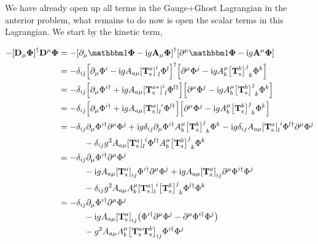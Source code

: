 We have already open up all terms in the Gauge+Ghost Lagrangian in the anterior problem,
what remains to do now is open the scalar terms in this Lagrangian. We start by the kinetic 
term,

\begin{align}
    -\qty[\vb D_\mu\boldsymbol\Phi]^\dagger\vb D^\mu\boldsymbol\Phi&=
    -\qty[\partial_\mu\mathbbm 1\boldsymbol\Phi-\im g\vb A_\mu\boldsymbol\Phi]^\dagger
    \qty[\partial^\mu\mathbbm 1\boldsymbol\Phi-\im g\vb A^\mu\boldsymbol\Phi]\nonumber\\
    &=-\delta_{ij}\qty[\partial_\mu\Phi^i-\im gA_{a\mu}\tensor{\qty[\vb T^a_{\textnormal s}]}{^i_l}\Phi^l]^\dagger
    \qty[\partial^\mu\Phi^j-\im g A_b^{\mu}\tensor{\qty[\vb T^b_{\textnormal s}]}{^j_k}\Phi^k]\nonumber\\
    &=-\delta_{ij}\qty[\partial_\mu\Phi^{i\dagger}+\im gA_{a\mu}\tensor{\qty[\vb T^{a\ast}_{\textnormal s}]}{^i_l}\Phi^{l\dagger}]
    \qty[\partial^\mu\Phi^j-\im g A_b^{\mu}\tensor{\qty[\vb T^b_{\textnormal s}]}{^j_k}\Phi^k]\nonumber\\
    &=-\delta_{ij}\qty[\partial_\mu\Phi^{i\dagger}+\im gA_{a\mu}\tensor{\qty[\vb T^{a}_{\textnormal s}]}{_l^i}\Phi^{l\dagger}]
    \qty[\partial^\mu\Phi^j-\im g A_b^{\mu}\tensor{\qty[\vb T^b_{\textnormal s}]}{^j_k}\Phi^k]\nonumber\\
    &=-\delta_{ij}\partial_\mu\Phi^{i\dagger}\partial^\mu\Phi^j
    +\im g \delta_{ij}\partial_\mu\Phi^{i\dagger}A_b^{\mu}\tensor{\qty[\vb T^b_{\textnormal s}]}{^j_k}\Phi^k
    -\im g\delta_{ij}A_{a\mu}\tensor{\qty[\vb T^{a}_{\textnormal s}]}{_l^i}\Phi^{l\dagger}\partial^\mu\Phi^j\nonumber\\
    &\quad\quad\quad-\delta_{ij}g^2A_{a\mu}\tensor{\qty[\vb T^{a}_{\textnormal s}]}{_l^i}\Phi^{l\dagger}A_b^{\mu}\tensor{\qty[\vb T^b_{\textnormal s}]}{^j_k}\Phi^k
    \nonumber\\
    &=-\delta_{ij}\partial_\mu\Phi^{i\dagger}\partial^\mu\Phi^j\nonumber\\
    &\quad\quad\quad
    -\im gA_{a\mu}\tensor{\qty[\vb T^{a}_{\textnormal s}]}{_i_j}\Phi^{i\dagger}\partial^\mu\Phi^j
    +\im gA_{a\mu}\tensor{\qty[\vb T^a_{\textnormal s}]}{_i_j}\partial^\mu\Phi^{i\dagger}\Phi^j\nonumber\\
    &\quad\quad\quad-\delta_{ij}g^2A_{a\mu}A_b^\mu\tensor{\qty[\vb T^{a}_{\textnormal s}]}{_l^i}\tensor{\qty[\vb T^b_{\textnormal s}]}{^j_k}\Phi^{l\dagger}\Phi^k
    \nonumber\\
    &=-\delta_{ij}\partial_\mu\Phi^{i\dagger}\partial^\mu\Phi^j\nonumber\\
    &\quad\quad\quad
    -\im gA_{a\mu}\tensor{\qty[\vb T^{a}_{\textnormal s}]}{_i_j}\qty(\Phi^{i\dagger}\partial^\mu\Phi^j-\partial^\mu\Phi^{i\dagger}\Phi^j)\nonumber\\
    &\quad\quad\quad-g^2A_{a\mu}A_b^\mu
    \tensor{\qty[\vb T^{a}_{\textnormal s}\vb T^b_{\textnormal s}]}{_i_j}
    \Phi^{i\dagger}\Phi^j\nonumber
\end{align}

